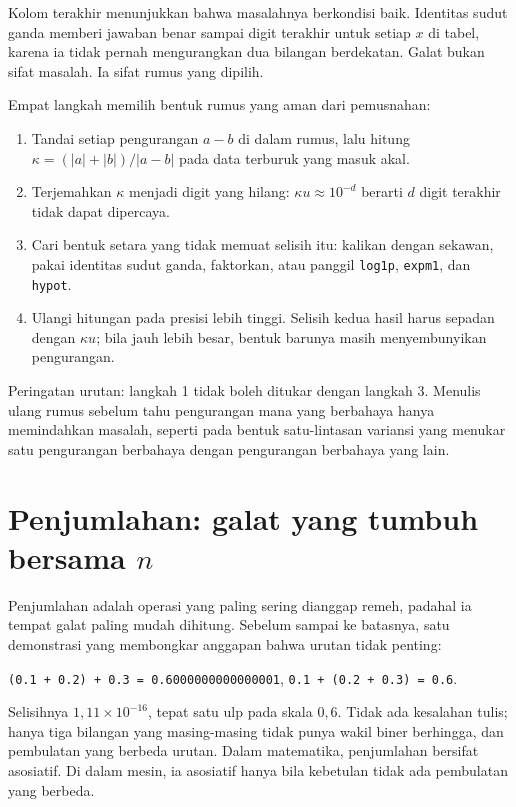 Kolom terakhir menunjukkan bahwa masalahnya berkondisi baik. Identitas sudut ganda
memberi jawaban benar sampai digit terakhir untuk setiap $x$ di tabel, karena ia tidak
pernah mengurangkan dua bilangan berdekatan. Galat bukan sifat masalah. Ia sifat rumus
yang dipilih.

\begin{resep}
Empat langkah memilih bentuk rumus yang aman dari pemusnahan:
\begin{enumerate}
  \item Tandai setiap pengurangan $a-b$ di dalam rumus, lalu hitung
        $\kappa=(|a|+|b|)/|a-b|$ pada data terburuk yang masuk akal.
  \item Terjemahkan $\kappa$ menjadi digit yang hilang: $\kappa u\approx10^{-d}$
        berarti $d$ digit terakhir tidak dapat dipercaya.
  \item Cari bentuk setara yang tidak memuat selisih itu: kalikan dengan sekawan,
        pakai identitas sudut ganda, faktorkan, atau panggil \texttt{log1p},
        \texttt{expm1}, dan \texttt{hypot}.
  \item Ulangi hitungan pada presisi lebih tinggi. Selisih kedua hasil harus sepadan
        dengan $\kappa u$; bila jauh lebih besar, bentuk barunya masih menyembunyikan
        pengurangan.
\end{enumerate}
Peringatan urutan: langkah 1 tidak boleh ditukar dengan langkah 3. Menulis ulang rumus
sebelum tahu pengurangan mana yang berbahaya hanya memindahkan masalah, seperti pada
bentuk satu-lintasan variansi yang menukar satu pengurangan berbahaya dengan
pengurangan berbahaya yang lain.
\end{resep}

\section{Penjumlahan: galat yang tumbuh bersama $n$}

Penjumlahan adalah operasi yang paling sering dianggap remeh, padahal ia tempat galat
paling mudah dihitung. Sebelum sampai ke batasnya, satu demonstrasi yang membongkar
anggapan bahwa urutan tidak penting:

\begin{center}
\texttt{(0.1 + 0.2) + 0.3 = 0.6000000000000001}, \quad
\texttt{0.1 + (0.2 + 0.3) = 0.6}.
\end{center}

Selisihnya $1{,}11\times10^{-16}$, tepat satu ulp pada skala $0{,}6$. Tidak ada
kesalahan tulis; hanya tiga bilangan yang masing-masing tidak punya wakil biner
berhingga, dan pembulatan yang berbeda urutan. Dalam matematika, penjumlahan bersifat
asosiatif. Di dalam mesin, ia asosiatif hanya bila kebetulan tidak ada pembulatan yang
berbeda.

